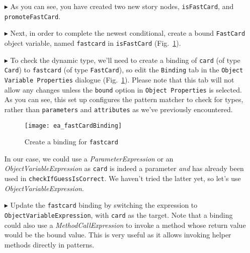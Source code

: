 \begin{itemize}
\item[$\blacktriangleright$] As you can see, you have created two new story nodes, \texttt{isFastCard}, and \texttt{promoteFastCard}.
 
\item[$\blacktriangleright$] Next, in order to complete the newest conditional, create a bound \texttt{FastCard} object variable, named \texttt{fastcard} in
\texttt{isFastCard} (Fig.~\ref{ea:fastCardBinding}).
 
\item[$\blacktriangleright$] To check the dynamic type, we'll need to create a binding of \texttt{card} (of type \texttt{Card}) to \texttt{fastcard} (of
type \texttt{FastCard}), so edit the \texttt{Binding} tab in the \texttt{Object Variable Properties} dialogue (Fig.~\ref{ea:fastCardBinding}). Please note that
this tab will not allow any changes unless the \texttt{bound} option in \texttt{Object Properties} is selected. As you can see, this set up configures the
pattern matcher to check for types, rather than \texttt{parameters} and \texttt{attributes} as we've previously encountered.

\vspace{0.5cm}

\begin{figure}[htbp]
\begin{center}
  \texttt{[image: ea\_fastCardBinding]}
  \caption{Create a binding for \texttt{fastcard}}  
  \label{ea:fastCardBinding}
\end{center}
\end{figure}

\clearpage

In our case, we could use a \emph{ParameterExpression} or an \emph{ObjectVariableExpression} as \texttt{card} is indeed a
parameter \emph{and} has already been used in \texttt{checkIfGuessIsCorrect}. We haven't tried the latter yet, so let's use \emph{ObjectVariableExpression}.

\item[$\blacktriangleright$] Update the \texttt{fastcard} binding by switching the expression to 
\texttt{Object\-Vari\-able\-Ex\-pres\-sion}, with \texttt{card} as the target. Note that a binding could also use a \emph{MethodCallExpression} to invoke a
method whose return value would be the bound value. This is very useful as it allows invoking helper methods directly in patterns.


\end{itemize}
